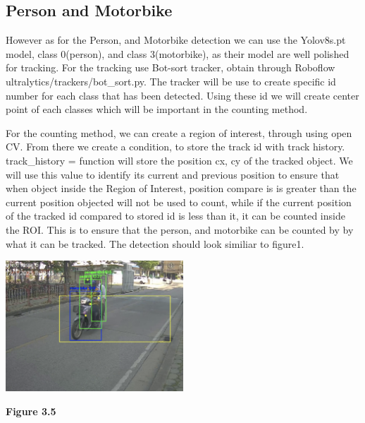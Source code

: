 \subsection{Person and Motorbike}
\noindent\hspace{2.5em}However as for the Person, and Motorbike detection we can use the Yolov8s.pt model, class 0(person), and class 3(motorbike), as their model are well polished for tracking. For the tracking use Bot-sort tracker, obtain through Roboflow ultralytics/trackers/bot\_sort.py. The tracker will be use to create specific id number for each class that has been detected. Using these id we will create center point of each classes which will be important in the counting method.


\noindent\hspace{2.5em}For the counting method, we can create a region of interest, through using open CV. From there we create a condition, to store the track id with track history. track\_history = {}   function will store the position cx, cy of the tracked object. We will use this value to identify its current and previous position to ensure that when object inside the Region of Interest, position compare is is greater than the current position objected will not be used to count, while if the current position of the tracked id compared to stored id is less than it, it can be counted inside the ROI. This is to ensure that the person, and motorbike can be counted by by what it can be tracked. The detection should look similiar to figure1.

\begin{center}
	\includegraphics[width=0.5\textwidth]{fig1.png}
	
	\vspace{0.5em}
	\textbf{Figure 3.5}
\end{center}


